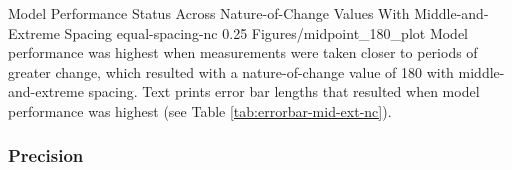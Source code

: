 \documentclass[
12pt, %
twoside,
english]{guelphthesis}
\begin{document}
\begin{apaFigure}
[portrait]
[samepage]
[0cm]
{Model Performance Status Across Nature-of-Change Values With Middle-and-Extreme Spacing}
{equal-spacing-nc}
{0.25}
{Figures/midpoint_180_plot}
{Model performance was highest when measurements were taken closer to periods of greater change, which resulted with a nature-of-change value of 180 with middle-and-extreme spacing. Text prints error bar lengths that resulted when model performance was highest (see Table \ref{tab:errorbar-mid-ext-nc}).}
\end{apaFigure}
\hypertarget{precision-mid-ext-exp1}{%
\subsubsection{Precision}\label{precision-mid-ext-exp1}}
\end{document}
